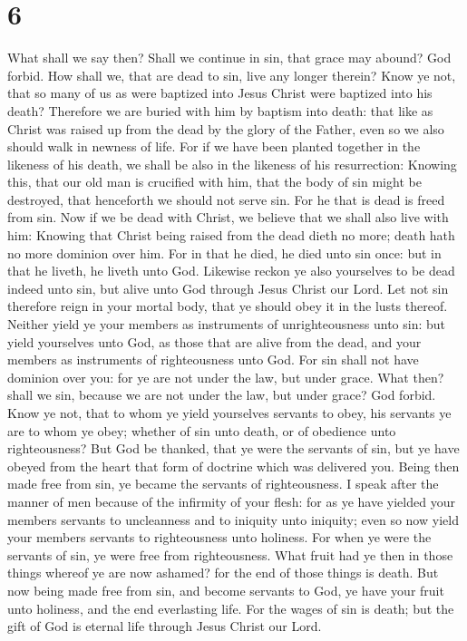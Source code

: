 \hypertarget{section-5}{%
\section{6}\label{section-5}}

 What shall we say then? Shall we continue in sin, that
grace may abound?  God forbid. How shall we, that are dead
to sin, live any longer therein?  Know ye not, that so many
of us as were baptized into Jesus Christ were baptized into his death?
 Therefore we are buried with him by baptism into death:
that like as Christ was raised up from the dead by the glory of the
Father, even so we also should walk in newness of life.  For
if we have been planted together in the likeness of his death, we shall
be also in the likeness of his resurrection:  Knowing this,
that our old man is crucified with him, that the body of sin might be
destroyed, that henceforth we should not serve sin.  For he
that is dead is freed from sin.  Now if we be dead with
Christ, we believe that we shall also live with him: 
Knowing that Christ being raised from the dead dieth no more; death hath
no more dominion over him.  For in that he died, he died
unto sin once: but in that he liveth, he liveth unto God. 
Likewise reckon ye also yourselves to be dead indeed unto sin, but alive
unto God through Jesus Christ our Lord.  Let not sin
therefore reign in your mortal body, that ye should obey it in the lusts
thereof.  Neither yield ye your members as instruments of
unrighteousness unto sin: but yield yourselves unto God, as those that
are alive from the dead, and your members as instruments of
righteousness unto God.  For sin shall not have dominion
over you: for ye are not under the law, but under grace. 
What then? shall we sin, because we are not under the law, but under
grace? God forbid.  Know ye not, that to whom ye yield
yourselves servants to obey, his servants ye are to whom ye obey;
whether of sin unto death, or of obedience unto righteousness?
 But God be thanked, that ye were the servants of sin, but
ye have obeyed from the heart that form of doctrine which was delivered
you.  Being then made free from sin, ye became the servants
of righteousness.  I speak after the manner of men because
of the infirmity of your flesh: for as ye have yielded your members
servants to uncleanness and to iniquity unto iniquity; even so now yield
your members servants to righteousness unto holiness.  For
when ye were the servants of sin, ye were free from righteousness.
 What fruit had ye then in those things whereof ye are now
ashamed? for the end of those things is death.  But now
being made free from sin, and become servants to God, ye have your fruit
unto holiness, and the end everlasting life.  For the wages
of sin is death; but the gift of God is eternal life through Jesus
Christ our Lord.


